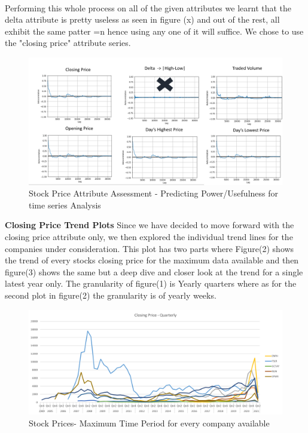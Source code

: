 \documentclass[sigconf, nonacm]{acmart}
\begin{document}
\\ Performing this whole process on all of the given attributes we learnt that the delta attribute is pretty useless as seen in figure (x) and out of the rest, all exhibit the same patter =n hence using any one of it will suffice. We chose to use the "closing price" attribute series. 
\begin{figure}[H]
  \centering
  \includegraphics[width=\linewidth]{images/autocorr.PNG}
  \caption{Stock Price Attribute Assessment - Predicting Power/Usefulness for time series Analysis}
\end{figure}



\textbf{Closing Price Trend Plots}
Since we have decided to move forward with the closing price attribute only, we then explored the individual trend lines for the companies under consideration. This plot has two parts where Figure(2) shows the trend of every stocks closing price for the maximum data available and then figure(3) shows the same but a deep dive and closer look at the trend for a single latest year only. The granularity of figure(1) is Yearly quarters where as for the second plot in figure(2) the granularity is of yearly weeks.
\begin{figure}[H]
  \centering
  \includegraphics[width=\linewidth]{images/allstocks.png}
  \caption{Stock Prices- Maximum Time Period for every company available}
\end{figure}
\end{document}
